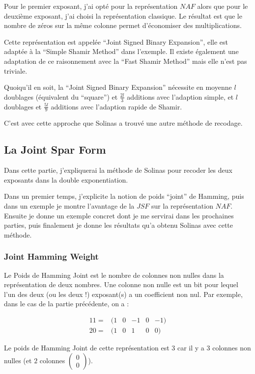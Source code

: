 \documentclass[12pt, a4paper]{memoir}
\newcommand{\doublezero}{\begin{pmatrix} 0 \\ 0 \end{pmatrix}}
\begin{document}
  Pour le premier exposant, j'ai opté pour la représentation $NAF$ alors que pour le deuxième exposant, j'ai choisi la représentation classique.
  Le résultat est que le nombre de zéros sur la même colonne permet d'économiser des multiplications.
  
  Cette représentation est appelée ``Joint Signed Binary Expansion'', elle est adaptée à la ``Simple Shamir Method'' dans l'exemple.
  Il existe également une adaptation de ce raisonnement avec la ``Fast Shamir Method'' mais elle n'est pas triviale.
  
  Quoiqu'il en soit, la ``Joint Signed Binary Expansion'' nécessite en moyenne $l$ doublages (équivalent du ``square'')
  et $\frac{2l}{3}$ additions avec l'adaption simple, et $l$ doublages et $\frac{5l}{9}$ additions avec l'adaption rapide de Shamir.
  
  C'est avec cette approche que Solinas a trouvé une autre méthode de recodage.

\subsection{La Joint Spar Form}

Dans cette partie, j'expliquerai la méthode de Solinas pour recoder les deux exposants dans la double exponentiation.

Dans un premier temps, j'explicite la notion de poids ``joint'' de Hamming, puis dans un exemple je montre l'avantage de la
$JSF$ sur la représentation $NAF$. Ensuite je donne un exemple concret dont je me servirai dans les prochaines parties,
puis finalement je donne les résultats qu'a obtenu Solinas avec cette méthode.

\subsubsection{Joint Hamming Weight}

Le Poids de Hamming Joint est le nombre de colonnes non nulles dans la représentation de deux nombres.
Une colonne non nulle est un bit pour lequel l'un des deux (ou les deux !) exposant(s) a un coefficient non nul.
Par exemple, dans le cas de la partie précédente, on a :

  $$\begin{array}{ccccccc}
  11 = & (1 & 0 & -1 & 0 & -1) \\
  20 = & (1 & 0 & 1 & 0 & 0)
  \end{array}$$

Le poids de Hamming Joint de cette représentation est $3$ car il y a $3$ colonnes non nulles (et $2$ colonnes $\doublezero$).
\end{document}
